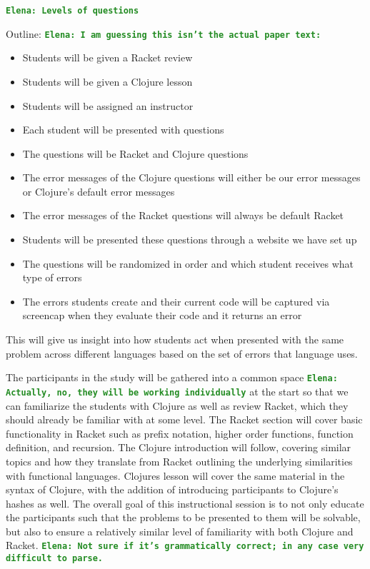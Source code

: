 \documentclass[12pt]{article}
\newcommand{\comment}[1]{{\bf \tt  {#1}}}
\newcommand{\emcomment}[1]{\textcolor{ForestGreen}{\comment{Elena: {#1}}}}
\begin{document}
\emcomment{Levels of questions}

Outline: \emcomment{I am guessing this isn't the actual paper text:}
\begin{itemize}
\item Students will be given a Racket review
\item Students will be given a Clojure lesson
\item Students will be assigned an instructor
\item Each student will be presented with questions
\item The questions will be Racket and Clojure questions
\item The error messages of the Clojure questions will either be our error messages or Clojure's default error messages
\item The error messages of the Racket questions will always be default Racket
\item Students will be presented these questions through a website we have set up
\item The questions will be randomized in order and which student receives what type of errors
\item The errors students create and their current code will be captured via screencap when they evaluate their code and it returns an error
\end{itemize}
This will give us insight into how students act when presented with the same problem across different languages based on the set of errors that language uses.

	The participants in the study will be gathered into a common space \emcomment{Actually, no, they will be working individually} at the start so that we can familiarize the students with Clojure as well as review Racket, which they should already be familiar with at some level. The Racket section will cover basic functionality in Racket such as prefix notation, higher order functions, function definition, and recursion. The Clojure introduction will follow, covering similar topics and how they translate from Racket outlining the underlying similarities with functional languages. Clojures lesson will cover the same material in the syntax of Clojure, with the addition of introducing participants to Clojure's hashes as well. The overall goal of this instructional session is to not only educate the participants such that the problems to be presented to them will be solvable, but also to ensure a relatively similar level of familiarity with both Clojure and Racket. \emcomment{Not sure if it's grammatically correct; in any case very difficult to parse.}
\end{document}
